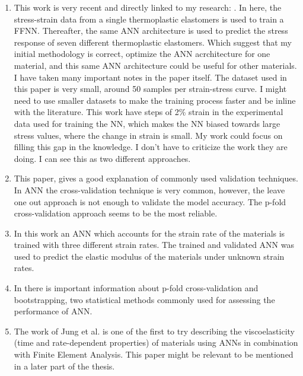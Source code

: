 \begin{enumerate}
    \item This work is very recent and directly linked to my research: \cite{rodriguez2019application}. In here, the stress-strain data from a single thermoplastic elastomers is used to train a FFNN. Thereafter, the same ANN architecture is used to predict the stress response of seven different thermoplastic elastomers. Which suggest that my initial methodology is correct, optimize the ANN acrchitecture for one material, and this same ANN  architecture could be useful for other materials. I have taken many important notes in the paper itself. The dataset used in this paper is very small, around 50 samples per strain-stress curve. I might need to use smaller datasets to make the training process faster and be inline with the literature. This work have steps of 2\% strain in the experimental data used for training the NN, which makes the NN biased towards large stress values, where the change in strain is small. My work could focus on filling this gap in the knowledge. I don't have to criticize the work they are doing. I can see this as two different approaches.
    \item This paper, \cite{wang2007review} gives a good explanation of commonly used validation techniques. In ANN the cross-validation technique is very common, however, the leave one out approach is not enough to validate the model accuracy. The p-fold cross-validation approach seems to be the most reliable.
    \item In this work \cite{xu2019artificial} an ANN which accounts for the strain rate of the materials is trained with three different strain rates. The trained and validated ANN was used to predict the elastic modulus of the materials under unknown strain rates.
    \item In \cite{koskela2003neural,paliwal2009neural} there is important information about p-fold cross-validation and bootstrapping, two statistical methods commonly used for assessing the performance of ANN.
    \item The work of Jung et al. \cite{jung2006neural} is one of the first to try describing the viscoelasticity (time and rate-dependent properties) of materials using ANNs in combination with Finite Element Analysis. This paper might be relevant to be mentioned in a later part of the thesis. 
\end{enumerate}




